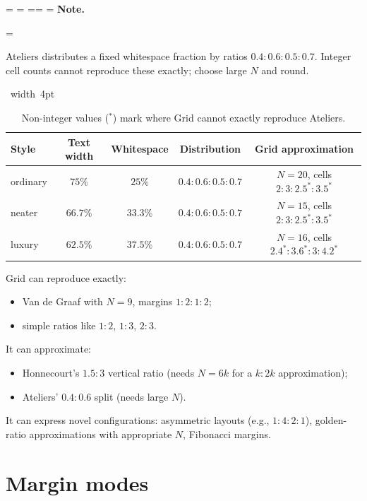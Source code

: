 \documentclass[11pt, twoside, openany]{book}
\makeatletter
\newcommand*{\cns@tag@artifact@begin}{}
\newcommand*{\cns@tag@artifact@end}{}
\newenvironment{TodoNote}[1][]{%
  \par\addvspace{0.5\baselineskip plus 2pt}%
  \setbox\cns@box=\vbox\bgroup
    \hsize=\linewidth
    \advance\hsize -10pt
    \linewidth=\hsize \columnwidth=\hsize
    \parindent=\z@
    \noindent\textbf{\sffamily Note\cns@ifnotempty{#1}{ \textmd{(#1)}}.}%
    \par\nobreak
    \@afterindentfalse\@afterheading
    \leftskip=\cns@indent\relax
    \ignorespaces
}{%
  \par
  \egroup
  \vbox{\hbox{%
    \cns@tag@artifact@begin\vrule width 4pt\cns@tag@artifact@end
    \hskip 6pt\relax
    \box\cns@box
  }}%
  \par\addvspace{0.5\baselineskip plus 2pt}%
}
\makeatother
\begin{document}
\begin{TodoNote}
	Ateliers distributes a fixed whitespace fraction by ratios $0.4:0.6:0.5:0.7$. Integer cell counts cannot reproduce these exactly; choose large $N$ and round.
	
\end{TodoNote}

\begin{table}[h]
	\centering
	\caption{Non-integer values ($^{*}$) mark where Grid cannot exactly reproduce Ateliers.}
	\label{tab:todonote}
	\begin{tabular}{@{}lcccc@{}}
		\toprule
		\bfseries Style & \bfseries Text width & \bfseries Whitespace & \bfseries Distribution & \bfseries Grid approximation              \\
		\midrule
		ordinary        & $75\%$               & $25\%$               & $0.4:0.6:0.5:0.7$      & $N=20$, cells $2:3:2.5^{*}:3.5^{*}$       \\
		neater          & $66.7\%$             & $33.3\%$             & $0.4:0.6:0.5:0.7$      & $N=15$, cells $2:3:2.5^{*}:3.5^{*}$       \\
		luxury          & $62.5\%$             & $37.5\%$             & $0.4:0.6:0.5:0.7$      & $N=16$, cells $2.4^{*}:3.6^{*}:3:4.2^{*}$ \\
		\bottomrule
	\end{tabular}
\end{table}

Grid can reproduce exactly:

\begin{itemize}
	\item Van de Graaf with $N=9$, margins $1:2:1:2$;
	\item simple ratios like $1:2$, $1:3$, $2:3$.
\end{itemize}

It can approximate:

\begin{itemize}
	\item Honnecourt's $1.5:3$ vertical ratio (needs $N=6k$ for a $k:2k$ approximation);
	\item Ateliers' $0.4:0.6$ split (needs large $N$).
\end{itemize}

It can express novel configurations: asymmetric layouts (e.g., $1:4:2:1$), golden-ratio approximations with appropriate $N$, Fibonacci margins.

\chapter{Margin modes}\label{chapter:marginmodes}
\end{document}
